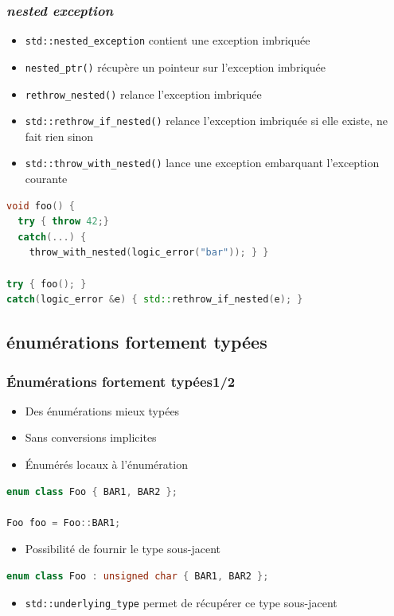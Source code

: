 \documentclass[C++.tex]{subfiles}
\begin{document}
\begin{frame}[fragile]
	\frametitle{\textit{nested exception}}
	\begin{itemize}
		\item \lstinline|std::nested_exception| contient une exception imbriquée
		\item \lstinline|nested_ptr()| récupère un pointeur sur l'exception imbriquée
		\item \lstinline|rethrow_nested()| relance l'exception imbriquée
		\item \lstinline|std::rethrow_if_nested()| relance l'exception imbriquée si elle existe, ne fait rien sinon
		\item \lstinline|std::throw_with_nested()| lance une exception embarquant l'exception courante
	\end{itemize}

	\begin{lstlisting}[language=C++]
void foo() {
  try { throw 42;}
  catch(...) { 
    throw_with_nested(logic_error("bar")); } }

try { foo(); }
catch(logic_error &e) { std::rethrow_if_nested(e); }\end{lstlisting}
\end{frame}

\subsection*{énumérations fortement typées}
\begin{frame}[fragile]
	\frametitle{Énumérations fortement typées\titlehfill{}1/2}
	\begin{itemize}
		\item Des énumérations mieux typées
		\item Sans conversions implicites


		\item Énumérés locaux à l'énumération
	\end{itemize}

	\begin{lstlisting}[language=C++]
enum class Foo { BAR1, BAR2 };

Foo foo = Foo::BAR1;\end{lstlisting}

	\begin{itemize}
		\item Possibilité de fournir le type sous-jacent
	\end{itemize}

	\begin{lstlisting}[language=C++]
enum class Foo : unsigned char { BAR1, BAR2 };\end{lstlisting}

	\begin{itemize}
		\item \lstinline|std::underlying_type| permet de récupérer ce type sous-jacent
	\end{itemize}
\end{frame}
\end{document}
